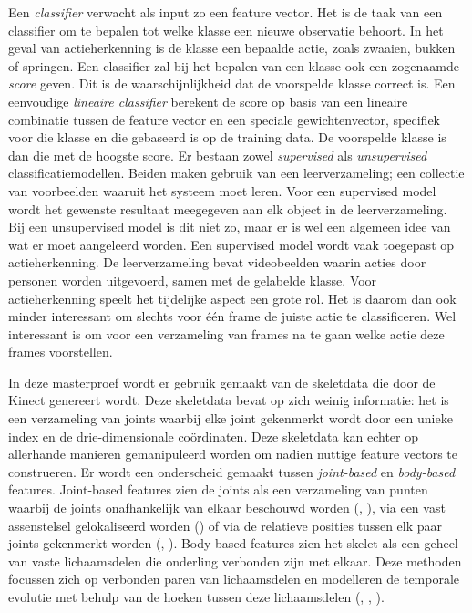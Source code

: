 Een \textit{classifier} verwacht als input zo een feature vector. Het is de taak van een classifier om te bepalen tot welke klasse een nieuwe observatie behoort. In het geval van actieherkenning is de klasse een bepaalde actie, zoals zwaaien, bukken of springen. Een classifier zal bij het bepalen van een klasse ook een zogenaamde \textit{score} geven. Dit is de waarschijnlijkheid dat de voorspelde klasse correct is. Een eenvoudige \textit{lineaire classifier} berekent de score op basis van een lineaire combinatie tussen de feature vector en een speciale gewichtenvector, specifiek voor die klasse en die gebaseerd is op de training data. De voorspelde klasse is dan die met de hoogste score. Er bestaan zowel \textit{supervised} als \textit{unsupervised} classificatiemodellen. Beiden maken gebruik van een leerverzameling; een collectie van voorbeelden waaruit het systeem moet leren. Voor een supervised model wordt het gewenste resultaat meegegeven aan elk object in de leerverzameling. Bij een unsupervised model is dit niet zo, maar er is wel een algemeen idee van wat er moet aangeleerd worden. Een supervised model wordt vaak toegepast op actieherkenning. De leerverzameling bevat videobeelden waarin acties door personen worden uitgevoerd, samen met de gelabelde klasse. Voor actieherkenning speelt het tijdelijke aspect een grote rol. Het is daarom dan ook minder interessant om slechts voor één frame de juiste actie te classificeren. Wel interessant is om voor een verzameling van frames na te gaan welke actie deze frames voorstellen. 



In deze masterproef wordt er gebruik gemaakt van de skeletdata die door de Kinect genereert wordt. Deze skeletdata bevat op zich weinig informatie: het is een verzameling van joints waarbij elke joint gekenmerkt wordt door een unieke index en de drie-dimensionale coördinaten. Deze skeletdata kan echter op allerhande manieren gemanipuleerd worden om nadien nuttige feature vectors te construeren. Er wordt een onderscheid gemaakt tussen \textit{joint-based} en \textit{body-based} features. Joint-based features zien de joints als een verzameling van punten waarbij de joints onafhankelijk van elkaar beschouwd worden (\cite{Hussein2011}, \cite{Lv2006}), via een vast assenstelsel gelokaliseerd worden (\cite{Xia2012}) of via de relatieve posities tussen elk paar joints gekenmerkt worden (\cite{Wang2012b}, \cite{Yang2012}). Body-based features zien het skelet als een geheel van vaste lichaamsdelen die onderling verbonden zijn met elkaar. Deze methoden focussen zich op verbonden paren van lichaamsdelen en modelleren de temporale evolutie met behulp van de hoeken tussen deze lichaamsdelen (\cite{Ofli2012}, \cite{Ohn-Bar2013}, \cite{Deboeverie2016}). 


